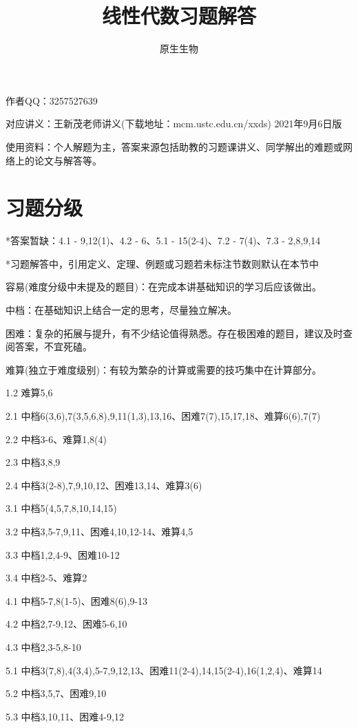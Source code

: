 \documentclass[a4paper,UTF8,fontset=windows]{ctexart}
\title{\heiti 线性代数习题解答}
\author{原生生物}
\date{}
\begin{document}
\maketitle

作者QQ：3257527639

对应讲义：王新茂老师讲义(下载地址：mcm.ustc.edu.cn/xxds) 2021年9月6日版

使用资料：个人解题为主，答案来源包括助教的习题课讲义、同学解出的难题或网络上的论文与解答等。

\tableofcontents

\newpage

\section*{习题分级}

*答案暂缺：4.1 - 9,12(1)、4.2 - 6、5.1 - 15(2-4)、7.2 - 7(4)、7.3 - 2,8,9,14

*习题解答中，引用定义、定理、例题或习题若未标注节数则默认在本节中

容易(难度分级中未提及的题目)：在完成本讲基础知识的学习后应该做出。

中档：在基础知识上结合一定的思考，尽量独立解决。

困难：复杂的拓展与提升，有不少结论值得熟悉。存在极困难的题目，建议及时查阅答案，不宜死磕。

难算(独立于难度级别)：有较为繁杂的计算或需要的技巧集中在计算部分。

1.2 难算5,6

2.1 中档6(3,6),7(3,5,6,8),9,11(1,3),13,16、困难7(7),15,17,18、难算6(6),7(7)

2.2 中档3-6、难算1,8(4)

2.3 中档3,8,9

2.4 中档3(2-8),7,9,10,12、困难13,14、难算3(6)

3.1 中档5(4,5,7,8,10,14,15)

3.2 中档3,5-7,9,11、困难4,10,12-14、难算4,5

3.3 中档1,2,4-9、困难10-12

3.4 中档2-5、难算2

4.1 中档5-7,8(1-5)、困难8(6),9-13

4.2 中档2,7-9,12、困难5-6,10

4.3 中档2,3-5,8-10

5.1 中档3(7,8),4(3,4),5-7,9,12,13、困难11(2-4),14,15(2-4),16(1,2,4)、难算14

5.2 中档3,5,7、困难9,10

5.3 中档3,10,11、困难4-9,12
\end{document}
